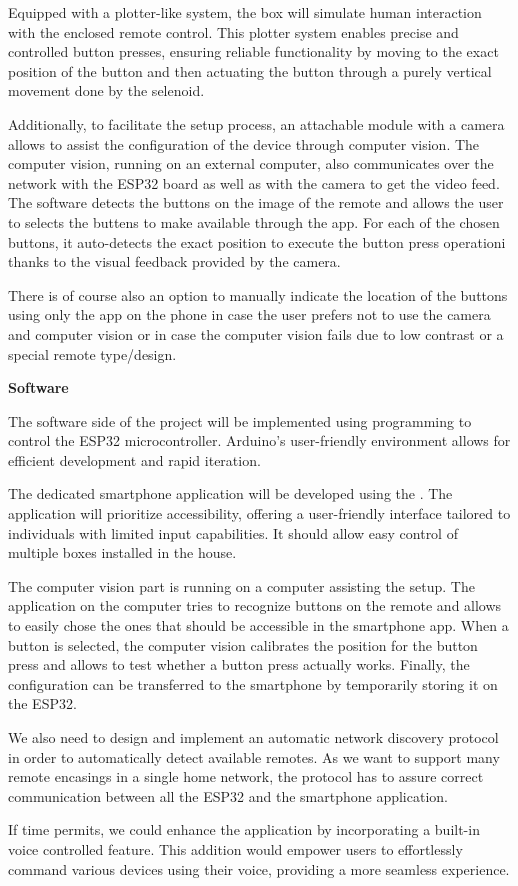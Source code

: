 Equipped with a plotter-like system, the box will simulate human interaction with the enclosed remote control.
This plotter system enables precise and controlled button presses, ensuring reliable functionality by moving to the exact position of the button and then actuating the button through a purely vertical movement done by the selenoid.


Additionally, to facilitate the setup process, an attachable module with a camera allows to assist the configuration of the device through computer vision.
The computer vision, running on an external computer, also communicates over the network with the ESP32 board as well as with the camera to get the video feed.
The software detects the buttons on the image of the remote and allows the user to selects the buttens to make available through the app.
For each of the chosen buttons, it auto-detects the exact position to execute the button press operationi thanks to the visual feedback provided by the camera.

There is of course also an option to manually indicate the location of the buttons using only the app on the phone in case the user prefers not to use the camera and computer vision or in case the computer vision fails due to low contrast or a special remote type/design. 


\textbf{Software}

The software side of the project will be implemented using  programming to control the ESP32 microcontroller.
Arduino's user-friendly environment allows for efficient development and rapid iteration.

The dedicated smartphone application will be developed using the .
The application will prioritize accessibility, offering a user-friendly interface tailored to individuals with limited input capabilities.
It should allow easy control of multiple boxes installed in the house.

The computer vision part is running on a computer assisting the setup. 
The application on the computer tries to recognize buttons on the remote and allows to easily chose the ones that should be accessible in the smartphone app.
When a button is selected, the computer vision calibrates the position for the button press and allows to test whether a button press actually works.
Finally, the configuration can be transferred to the smartphone by temporarily storing it on the ESP32.

We also need to design and implement an automatic network discovery protocol in order to automatically detect available remotes.
As we want to support many remote encasings in a single home network, the protocol has to assure correct communication between all the ESP32 and the smartphone application.

If time permits, we could enhance the application by incorporating a built-in voice controlled feature.
This addition would empower users to effortlessly command various devices using their voice, providing a more seamless experience.

